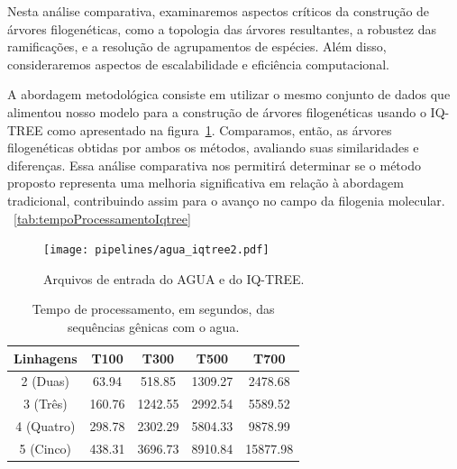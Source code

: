 Nesta análise comparativa, examinaremos aspectos críticos da construção de árvores filogenéticas, como a topologia das árvores resultantes, a robustez das ramificações, e a resolução de agrupamentos de espécies. Além disso, consideraremos aspectos de escalabilidade e eficiência computacional.

A abordagem metodológica consiste em utilizar o mesmo conjunto de dados que alimentou nosso modelo para a construção de árvores filogenéticas usando o IQ-TREE como apresentado na figura~\ref{fig:inputAguaIqtree}. Comparamos, então, as árvores filogenéticas obtidas por ambos os métodos, avaliando suas similaridades e diferenças. Essa análise comparativa nos permitirá determinar se o método proposto representa uma melhoria significativa em relação à abordagem tradicional, contribuindo assim para o avanço no campo da filogenia molecular.
~\ref{tab:tempoProcessamentoIqtree}

\begin{figure}[htb]
  \centering
  \caption{Arquivos de entrada do AGUA e do IQ-TREE.}
  \texttt{[image: pipelines/agua\_iqtree2.pdf]}
  ~\label{fig:inputAguaIqtree}
\end{figure}

\begin{table}[htb]
  \caption{Tempo de processamento, em segundos, das sequências gênicas com o \gls{agua}.}
  \begin{center}
    \begin{tabular}{c|c|c|c|c}
      \hline
      Linhagens  & T100   & T300    & T500    & T700     \\
      \hline
      2 (Duas)   & 63.94  & 518.85  & 1309.27 & 2478.68  \\
      3 (Três)   & 160.76 & 1242.55 & 2992.54 & 5589.52  \\
      4 (Quatro) & 298.78 & 2302.29 & 5804.33 & 9878.99  \\
      5 (Cinco)  & 438.31 & 3696.73 & 8910.84 & 15877.98 \\
      \hline
    \end{tabular}
  \end{center}
  \label{tab:tempoProcessamentoAgua}
\end{table}

